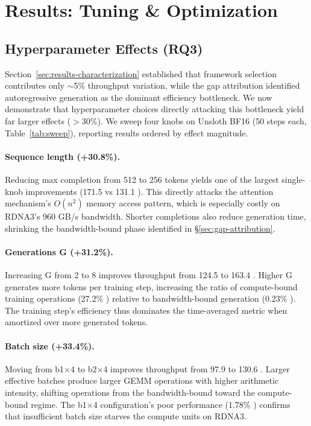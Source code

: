 \section{Results: Tuning \& Optimization}
\label{sec:results-tuning}

\subsection{Hyperparameter Effects (RQ3)}

Section~\ref{sec:results-characterization} established that framework selection contributes only $\sim$5\% throughput variation, while the gap attribution identified autoregressive generation as the dominant efficiency bottleneck. We now demonstrate that hyperparameter choices directly attacking this bottleneck yield far larger effects ($>$30\%). We sweep four knobs on Unsloth BF16 (50 steps each, Table~\ref{tab:sweep}), reporting results ordered by effect magnitude.

\paragraph{Sequence length (+30.8\%).} Reducing max completion from 512 to 256 tokens yields one of the largest single-knob improvements (171.5 vs 131.1 \toksec{}). This directly attacks the attention mechanism's $O(n^2)$ memory access pattern, which is especially costly on RDNA3's 960 GB/s bandwidth. Shorter completions also reduce generation time, shrinking the bandwidth-bound phase identified in \S\ref{sec:gap-attribution}.

\paragraph{Generations G (+31.2\%).} Increasing G from 2 to 8 improves throughput from 124.5 to 163.4 \toksec{}. Higher G generates more tokens per training step, increasing the ratio of compute-bound training operations (27.2\% \mfuprac{}) relative to bandwidth-bound generation (0.23\% \mfuprac{}). The training step's efficiency thus dominates the time-averaged metric when amortized over more generated tokens.

\paragraph{Batch size (+33.4\%).} Moving from b1$\times$4 to b2$\times$4 improves throughput from 97.9 to 130.6 \toksec{}. Larger effective batches produce larger GEMM operations with higher arithmetic intensity, shifting operations from the bandwidth-bound toward the compute-bound regime. The b1$\times$4 configuration's poor performance (1.78\% \mfuprac{}) confirms that insufficient batch size starves the compute units on RDNA3.


